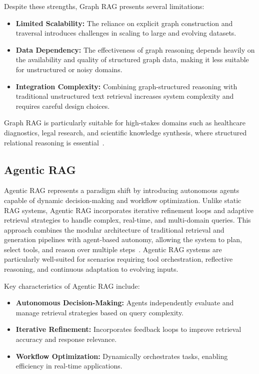 Despite these strengths, Graph RAG presents several limitations:
\begin{itemize}
    \item \textbf{Limited Scalability:} The reliance on explicit graph construction and traversal introduces challenges in scaling to large and evolving datasets.
    \item \textbf{Data Dependency:} The effectiveness of graph reasoning depends heavily on the availability and quality of structured graph data, making it less suitable for unstructured or noisy domains.
    \item \textbf{Integration Complexity:} Combining graph-structured reasoning with traditional unstructured text retrieval increases system complexity and requires careful design choices.
\end{itemize}

Graph RAG is particularly suitable for high-stakes domains such as healthcare diagnostics, legal research, and scientific knowledge synthesis, where structured relational reasoning is essential~\cite{yao2023graphrag}.

\subsection{Agentic RAG}

Agentic RAG represents a paradigm shift by introducing autonomous agents capable of dynamic decision-making and workflow optimization. Unlike static RAG systems, Agentic RAG incorporates iterative refinement loops and adaptive retrieval strategies to handle complex, real-time, and multi-domain queries. This approach combines the modular architecture of traditional retrieval and generation pipelines with agent-based autonomy, allowing the system to plan, select tools, and reason over multiple steps~\cite{ferrag2025can}. Agentic RAG systems are particularly well-suited for scenarios requiring tool orchestration, reflective reasoning, and continuous adaptation to evolving inputs.

Key characteristics of Agentic RAG include:
\begin{itemize}
  \item \textbf{Autonomous Decision-Making:} Agents independently evaluate and manage retrieval strategies based on query complexity.
  \item \textbf{Iterative Refinement:} Incorporates feedback loops to improve retrieval accuracy and response relevance.
  \item \textbf{Workflow Optimization:} Dynamically orchestrates tasks, enabling efficiency in real-time applications.
\end{itemize}

